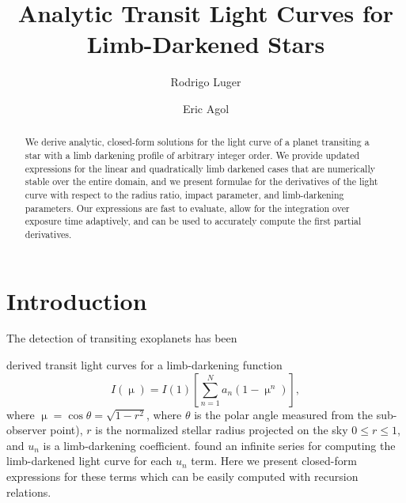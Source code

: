 \documentclass[modern]{aastex61}
\begin{document}

\setlength{\abovedisplayskip}{1.5em}
\setlength{\belowdisplayskip}{1.5em}

\title{%
Analytic Transit Light Curves for Limb-Darkened Stars
}

\author[0000-0002-0296-3826]{Rodrigo Luger}
\author{Eric Agol}


\begin{abstract}
 We derive analytic, closed-form solutions for the light curve
    of a planet transiting a star with a limb darkening profile of
    arbitrary integer order.  We provide updated expressions for the linear
    and quadratically limb darkened cases that are numerically stable
    over the entire domain, and we present formulae for the derivatives
    of the light curve with respect to the radius ratio, impact parameter,
    and limb-darkening parameters.  Our expressions are fast to evaluate,
    allow for the integration over exposure time adaptively, and
    can be used to accurately compute the first partial derivatives.
\end{abstract}

%
\section{Introduction}
\label{sec:intro}

The detection of transiting exoplanets has been 

\citet{Gimenez2006} derived transit light curves for a limb-darkening
function
\begin{equation}
I(\upmu) = I(1) \left[\sum_{n=1}^N a_n (1-\upmu^n) \right],
\end{equation}
where $\upmu = \cos{\theta} =\sqrt{1-r^2}$, where $\theta$ is the polar angle measured from the
sub-observer point), $r$ is the normalized stellar radius projected on the sky
$0\le r \le 1$, and $u_n$ is a limb-darkening coefficient.  \cite{Gimenez2006}
found an infinite series for computing the limb-darkened light curve for each $u_n$
term.  Here we present closed-form expressions for these terms which can be
easily computed with recursion relations.
\end{document}
